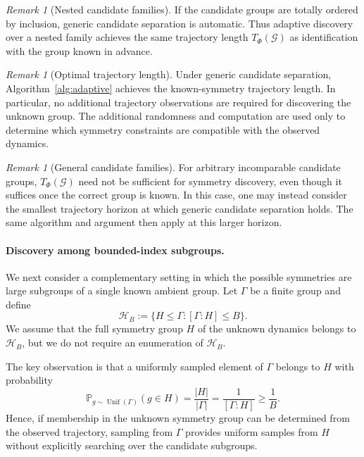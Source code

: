 \documentclass[11pt]{article}
\theoremstyle{plain}
\theoremstyle{definition}
\theoremstyle{remark}
\newtheorem{remark}[theorem]{Remark}
\begin{document}
\begin{remark}[Nested candidate families]
If the candidate groups are totally ordered by inclusion, generic candidate
separation is automatic. Thus adaptive discovery over a nested family achieves
the same trajectory length \(T_\Phi(\mathcal G)\) as identification with the
group known in advance.
\end{remark}

\begin{remark}[Optimal trajectory length]
Under generic candidate separation, Algorithm~\ref{alg:adaptive} achieves the
known-symmetry trajectory length. In particular, no additional trajectory
observations are required for discovering the unknown group. The additional
randomness and computation are used only to determine which symmetry
constraints are compatible with the observed dynamics.
\end{remark}

\begin{remark}[General candidate families]
For arbitrary incomparable candidate groups,
\(T_\Phi(\mathcal G)\) need not be sufficient for symmetry discovery, even
though it suffices once the correct group is known. In this case, one may
instead consider the smallest trajectory horizon at which generic candidate
separation holds. The same algorithm and argument then apply at this larger
horizon.
\end{remark}


 
\paragraph{Discovery among bounded-index subgroups.}
We next consider a complementary setting in which the possible symmetries are
large subgroups of a single known ambient group. Let \(\Gamma\) be a finite
group and define
\[
\mathcal H_B
:=
\{H\le \Gamma:[\Gamma:H]\le B\}.
\]
We assume that the full symmetry group \(H\) of the unknown dynamics belongs
to \(\mathcal H_B\), but we do not require an enumeration of
\(\mathcal H_B\).

The key observation is that a uniformly sampled element of \(\Gamma\) belongs
to \(H\) with probability
\[
\mathbb P_{g\sim\operatorname{Unif}(\Gamma)}(g\in H)
=
\frac{|H|}{|\Gamma|}
=
\frac{1}{[\Gamma:H]}
\ge \frac1B.
\]
Hence, if membership in the unknown symmetry group can be determined from the
observed trajectory, sampling from \(\Gamma\) provides uniform samples from
\(H\) without explicitly searching over the candidate subgroups.
\end{document}
